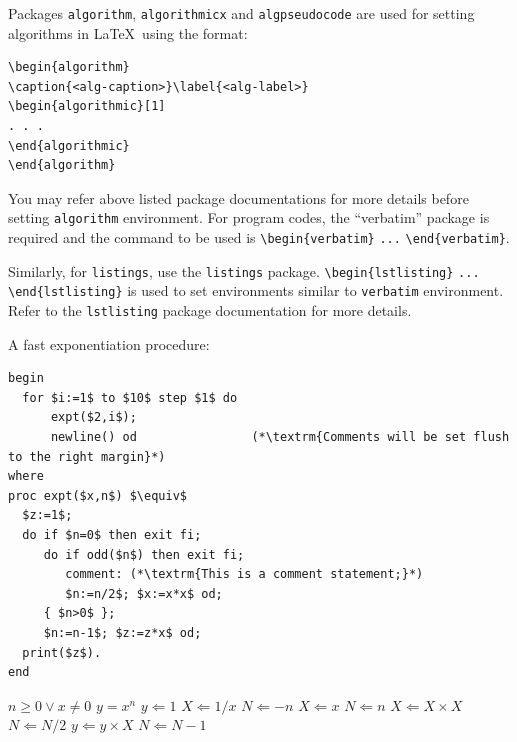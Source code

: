 \documentclass[pdflatex,sn-mathphys-num]{sn-jnl}%
\theoremstyle{thmstyleone}%
\theoremstyle{thmstyletwo}%
\theoremstyle{thmstylethree}%
\begin{document}
Packages \verb+algorithm+, \verb+algorithmicx+ and \verb+algpseudocode+ are used for setting algorithms in \LaTeX\ using the format:

\bigskip
\begin{verbatim}
\begin{algorithm}
\caption{<alg-caption>}\label{<alg-label>}
\begin{algorithmic}[1]
. . .
\end{algorithmic}
\end{algorithm}
\end{verbatim}
\bigskip

You may refer above listed package documentations for more details before setting \verb+algorithm+ environment. For program codes, the ``verbatim'' package is required and the command to be used is \verb+\begin{verbatim}+ \verb+...+ \verb+\end{verbatim}+. 

Similarly, for \verb+listings+, use the \verb+listings+ package. \verb+\begin{lstlisting}+ \verb+...+ \verb+\end{lstlisting}+ is used to set environments similar to \verb+verbatim+ environment. Refer to the \verb+lstlisting+ package documentation for more details.

A fast exponentiation procedure:

\begin{lstlisting}
begin
  for $i:=1$ to $10$ step $1$ do
      expt($2,i$);  
      newline() od                (*\textrm{Comments will be set flush to the right margin}*)
where
proc expt($x,n$) $\equiv$
  $z:=1$;
  do if $n=0$ then exit fi;
     do if odd($n$) then exit fi;                 
        comment: (*\textrm{This is a comment statement;}*)
        $n:=n/2$; $x:=x*x$ od;
     { $n>0$ };
     $n:=n-1$; $z:=z*x$ od;
  print($z$). 
end
\end{lstlisting}

\begin{algorithm}
\caption{Calculate $y = x^n$}\label{algo1}
\begin{algorithmic}[1]
\Require $n \geq 0 \vee x \neq 0$
\Ensure $y = x^n$ 
\State $y \Leftarrow 1$
\label{algln2}
        \State $X \Leftarrow 1 / x$
        \State $N \Leftarrow -n$
\Else
        \State $X \Leftarrow x$
        \State $N \Leftarrow n$
\EndIf
{}
            \State $X \Leftarrow X \times X$
            \State $N \Leftarrow N / 2$
        \Else[$N$ is odd]
            \State $y \Leftarrow y \times X$
            \State $N \Leftarrow N - 1$
        \EndIf
\EndWhile
\end{algorithmic}
\end{algorithm}
\end{document}
